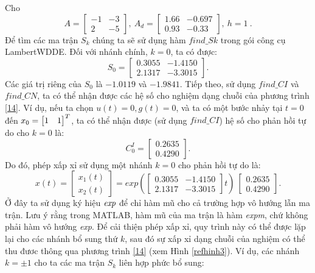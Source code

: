 \begin{vd}\label{vidu2.3} 
	Cho
	\begin{equation*} 
	A= \begin{bmatrix}
	-1&-3 \\
	2&-5
	\end{bmatrix}, \
	A_d=\begin{bmatrix}
	1.66&-0.697\\
	0.93&-0.33
	\end{bmatrix}, \
	h=1 \ . 
	\end{equation*}
	Để tìm các ma trận $S_k$ chúng ta sẽ sử dụng hàm $find\_Sk$ trong gói công cụ LambertWDDE.
	Đối với nhánh chính, $k = 0$, ta có được:
	\begin{equation*}
	S_0=\begin{bmatrix}
	0.3055&-1.4150\\
	2.1317&-3.3015
	\end{bmatrix}.
	\end{equation*}
	Các giá trị riêng của $S_0$ là $-1.0119$ và $-1.9841$. Tiếp theo, sử dụng $find\_CI$ và $find\_CN$, ta có thể nhận được các hệ số cho nghiệm dạng chuỗi của phương trình \eqref{14}. Ví dụ, nếu ta chọn $u(t)=0,g(t)=0$, và ta có một bước nhảy tại $t=0$ đến $x_0= \begin{bmatrix} 1 & 1 \end{bmatrix}^T$, ta có thể nhận được (sử dụng $find\_CI$) hệ số cho phản hồi tự do cho $k = 0$ là:
	\begin{equation*}
	C^I_0=\begin{bmatrix}
	0.2635\\
	0.4290
	\end{bmatrix}.
	\end{equation*}
	Do đó, phép xấp xỉ sử dụng một nhánh $k = 0$ cho phản hồi tự do là:
	\begin{equation*}
	x(t)=\begin{bmatrix}
	x_1(t)\\
	x_2(t)
	\end{bmatrix}
	= exp \left(
	\begin{bmatrix}
	0.3055&-1.4150\\
	2.1317&-3.3015
	\end{bmatrix} t
	\right)
	\ 
	\begin{bmatrix}
	0.2635\\
	0.4290
	\end{bmatrix}.
	\end{equation*}
	Ở đây ta sử dụng ký hiệu $\emph{exp}$ để chỉ hàm mũ cho cả trường hợp vô hướng lẫn ma trận. Lưu ý rằng trong MATLAB, hàm mũ của ma trận là hàm \emph{expm}, chứ không phải hàm vô hướng \emph{exp}. Để cải thiện phép xấp xỉ, quy trình này có thể được lặp lại cho các nhánh bổ sung thứ $k$, sau đó sự xấp xỉ dạng chuỗi của nghiệm có thể thu đươc thông qua phương trình \eqref{14} (xem Hình \ref{refhinh3}). Ví dụ, các nhánh $k=\pm 1$ cho ta các ma trận $S_k$ liên hợp phức bổ sung:

\end{vd}
